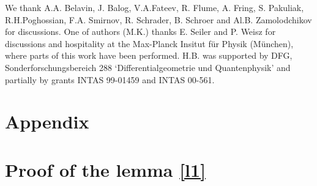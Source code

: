 \documentclass[a4paper,a4paper]{article}
\begin{document}
We thank A.A. Belavin, J. Balog, V.A.Fateev, R. Flume, A. Fring,
S. Pakuliak, R.H.Poghossian, 
F.A. Smirnov, R. Schrader, B. Schroer and Al.B. Zamolodchikov
for discussions. One of authors (M.K.) thanks E. Seiler and P. Weisz for
discussions and hospitality at the Max-Planck Insitut f\"{u}r Physik
(M\"{u}nchen), where parts of this work have been performed. H.B. was
supported by DFG, Sonderforschungsbereich 288 `Differentialgeometrie und
Quantenphysik' and partially by grants INTAS 99-01459 and INTAS 00-561.

\appendix

\section*{Appendix}

\renewcommand{\theequation}{\mbox{\Alph{section}.\arabic{equation}}} %
\setcounter{equation}{0}

\section{Proof of the lemma \ref{l1}}
\end{document}
